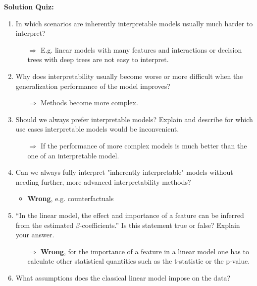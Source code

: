 \textbf{Solution Quiz:}\\\noindent
\medskip

   	
	\begin{enumerate}
   	    \item In which scenarios are inherently interpretable models usually much harder to interpret?
    	\begin{itemize}
    		\item[$\Rightarrow$] E.g. linear models with many features and interactions or decision trees with deep trees are not easy to interpret.
    	\end{itemize}
    	\item Why does interpretability usually become worse or more difficult when the generalization performance of the model improves?
    	\begin{itemize}
    		\item[$\Rightarrow$] Methods become more complex.
    	\end{itemize}
    	\item Should we always prefer interpretable models? Explain and describe for which use cases interpretable models would be inconvenient.
    	\begin{itemize}
    		\item[$\Rightarrow$] If the performance of more complex models is much better than the one of an interpretable model.
    	\end{itemize}
        \item Can we always fully interpret "inherently interpretable" models without needing further, more advanced interpretability methods?
        \begin{itemize}
            \item \textbf{Wrong}, e.g. counterfactuals
        \end{itemize}
    	\item ``In the linear model, the effect and importance of a feature can be inferred from the estimated $\beta$-coefficients.'' Is this statement true or false? Explain your answer.
    	\begin{itemize}
    		\item[$\Rightarrow$] \textbf{Wrong}, for the importance of a feature in a linear model one has to calculate other statistical quantities such as the t-statistic or the p-value.
    	\end{itemize}
        \item What assumptions does the classical linear model impose on the data?

\end{enumerate}
